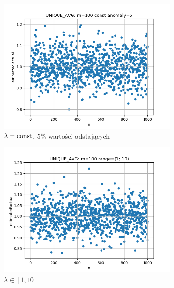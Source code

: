 \documentclass{article}
\begin{document}
\begin{figure}[H]
\begin{subfigure}{0.6\textwidth}
            \centering
            \includegraphics[width=\linewidth]{avg/zad1_const_5.png}
            \caption{$\lambda = \textnormal{const}$, $5\%$ wartości odstających}
        \end{subfigure}
        \begin{subfigure}{0.6\textwidth}
            \centering
            \includegraphics[width=\linewidth]{avg/zad1_range_1_10.png}
            \caption{$\lambda \in [1, 10]$}
        \end{subfigure}
        \begin{subfigure}{0.6\textwidth}
            \centering

\end{subfigure}
\end{figure}
\end{document}
